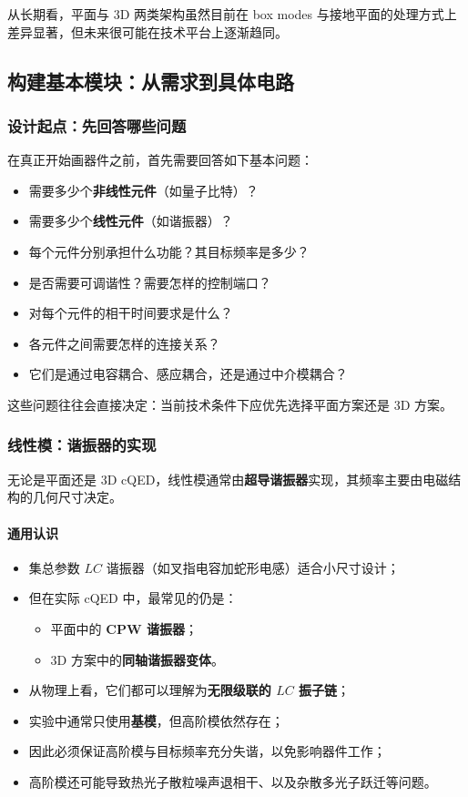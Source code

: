 \documentclass[12pt,a4paper,oneside]{ctexbook}
\begin{document}
从长期看，平面与 3D 两类架构虽然目前在 box modes 与接地平面的处理方式上差异显著，但未来很可能在技术平台上逐渐趋同。

\subsection{构建基本模块：从需求到具体电路}

\subsubsection{设计起点：先回答哪些问题}

在真正开始画器件之前，首先需要回答如下基本问题：
\begin{itemize}
    \item 需要多少个\textbf{非线性元件}（如量子比特）？
    \item 需要多少个\textbf{线性元件}（如谐振器）？
    \item 每个元件分别承担什么功能？其目标频率是多少？
    \item 是否需要可调谐性？需要怎样的控制端口？
    \item 对每个元件的相干时间要求是什么？
    \item 各元件之间需要怎样的连接关系？
    \item 它们是通过电容耦合、感应耦合，还是通过中介模耦合？
\end{itemize}

这些问题往往会直接决定：当前技术条件下应优先选择平面方案还是 3D 方案。

\subsubsection{线性模：谐振器的实现}

无论是平面还是 3D cQED，线性模通常由\textbf{超导谐振器}实现，其频率主要由电磁结构的几何尺寸决定。

\paragraph{通用认识}
\begin{itemize}
    \item 集总参数 \(LC\) 谐振器（如叉指电容加蛇形电感）适合小尺寸设计；
    \item 但在实际 cQED 中，最常见的仍是：
    \begin{itemize}
        \item 平面中的 \textbf{CPW 谐振器}；
        \item 3D 方案中的\textbf{同轴谐振器变体}。
    \end{itemize}
    \item 从物理上看，它们都可以理解为\textbf{无限级联的 \(LC\) 振子链}；
    \item 实验中通常只使用\textbf{基模}，但高阶模依然存在；
    \item 因此必须保证高阶模与目标频率充分失谐，以免影响器件工作；
    \item 高阶模还可能导致热光子散粒噪声退相干、以及杂散多光子跃迁等问题。
\end{itemize}
\end{document}
